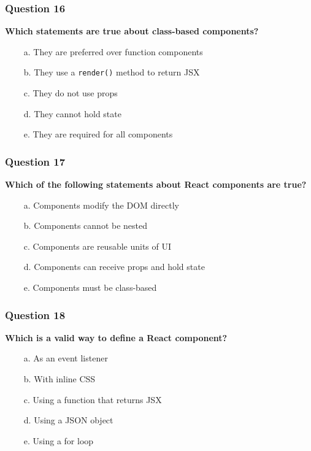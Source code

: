 \documentclass{article}
\newcommand{\cmark}{\textcolor{green}{\ding{51}}} %
\newcommand{\xmark}{\textcolor{red}{\ding{55}}}   %
\begin{document}
\subsubsection*{Question 16}
\textbf{Which statements are true about class-based components?}

\begin{itemize}
  \item[\xmark\ a.] They are preferred over function components
  \item[\cmark\ b.] They use a \texttt{render()} method to return JSX
  \item[\xmark\ c.] They do not use props
  \item[\xmark\ d.] They cannot hold state
  \item[\xmark\ e.] They are required for all components
\end{itemize}

\subsubsection*{Question 17}
\textbf{Which of the following statements about React components are true?}

\begin{itemize}
  \item[\xmark\ a.] Components modify the DOM directly
  \item[\xmark\ b.] Components cannot be nested
  \item[\cmark\ c.] Components are reusable units of UI
  \item[\cmark\ d.] Components can receive props and hold state
  \item[\xmark\ e.] Components must be class-based
\end{itemize}

\subsubsection*{Question 18}
\textbf{Which is a valid way to define a React component?}

\begin{itemize}
  \item[\xmark\ a.] As an event listener
  \item[\xmark\ b.] With inline CSS
  \item[\cmark\ c.] Using a function that returns JSX
  \item[\xmark\ d.] Using a JSON object
  \item[\xmark\ e.] Using a for loop
\end{itemize}
\end{document}
